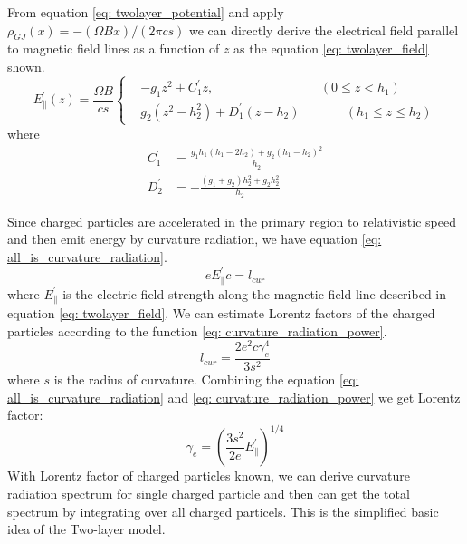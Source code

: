 \documentclass[12pt]{report}
\begin{document}
      From equation \ref{eq: twolayer_potential} and apply $\rho_{GJ}\left(x\right)=-\left(\Omega B x\right)/\left(2\pi cs\right)$ 
      we can directly derive the electrical field parallel to magnetic field lines as a function of $z$
      as the equation \ref{eq: twolayer_field} shown.
      \begin{equation}
        \label{eq: twolayer_field}
          E^{\prime}_{\parallel}\left(z\right) = \frac{\Omega B}{cs}
          \left\{\begin{alignedat}{2}
             & -g_1 z^2 + C_1^{\prime}z ,  &&\left(0 \leq z < h_{1}\right)\\
             & g_2\left(z^2 - h_2^2\right) + D_1^{\prime}\left(z-h_2\right)  &&\qquad \left(h_{1} \leq z \leq h_{2}\right) 
          \end{alignedat}\right.
      \end{equation}
      where 
      \begin{align*}
        C_{1}^{\prime} &= \frac{g_1 h_1 \left(h_1 - 2h_2\right)+ g_2\left(h_1-h_2\right)^2}{h_2} \\
        D_{2}^{\prime} &= -\frac{\left(g_1 + g_2\right)h_2^2 + g_2 h_2^2}{h_2}
      \end{align*}

      Since charged particles are accelerated in the primary region to relativistic speed 
      and then emit energy by curvature radiation, we have equation \ref{eq: all_is_curvature_radiation}.
      \begin{equation}
        \label{eq: all_is_curvature_radiation}
        e E_{\parallel}^{\prime} c = l_{cur}
      \end{equation}
      where $E_\parallel^{\prime}$ is the electric field strength along the magnetic field line 
      described in equation \ref{eq: twolayer_field}.
      We can estimate Lorentz factors of the charged particles according to the function 
      \ref{eq: curvature_radiation_power}.
      \begin{equation}
        \label{eq: curvature_radiation_power}
        l_{cur} = \frac{2 e^2 c \gamma^{4}_{e}}{3s^2}
      \end{equation}      
      where $s$ is the radius of curvature. 
      Combining the equation \ref{eq: all_is_curvature_radiation} and 
      \ref{eq: curvature_radiation_power} we get Lorentz factor: 
      \begin{equation}
        \label{eq: gamma_can_be_zero}
        \gamma_{e} = \left(\frac{3s^2}{2e} E_{\parallel}^{\prime}\right)^{1/4}
      \end{equation}
      With Lorentz factor of charged particles known, we can derive curvature radiation spectrum
      for single charged particle and then can get the total spectrum by integrating over all 
      charged particels. This is the simplified basic idea of the Two-layer model. 
\end{document}
